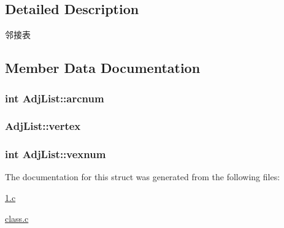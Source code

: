 \subsection{\-Detailed \-Description}
邻接表 

\subsection{\-Member \-Data \-Documentation}
\hypertarget{struct_adj_list_a76226967630f823b2a15095bd4309785}{
\subsubsection[{arcnum}]{\setlength{\rightskip}{0pt plus 5cm}int {\bf \-Adj\-List\-::arcnum}}}\label{struct_adj_list_a76226967630f823b2a15095bd4309785}
\hypertarget{struct_adj_list_a6cf73ce6e12e0bec2a54a3c138c7f919}{
\subsubsection[{vertex}]{ {\bf \-Adj\-List\-::vertex}}}\label{struct_adj_list_a6cf73ce6e12e0bec2a54a3c138c7f919}
\hypertarget{struct_adj_list_a32fc57f915225dbd6849e8b17518557d}{
\subsubsection[{vexnum}]{\setlength{\rightskip}{0pt plus 5cm}int {\bf \-Adj\-List\-::vexnum}}}\label{struct_adj_list_a32fc57f915225dbd6849e8b17518557d}


\-The documentation for this struct was generated from the following files\-:\begin{DoxyCompactItemize}
\item 
\hyperlink{1_8c}{1.\-c}\item 
\hyperlink{class_8c}{class.\-c}\end{DoxyCompactItemize}
